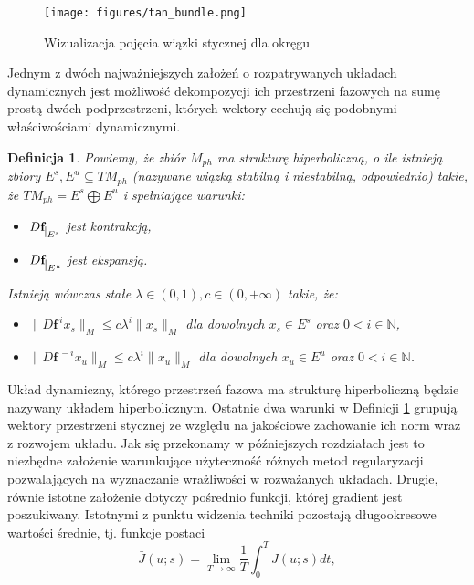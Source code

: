 \documentclass[12pt]{article}
\newtheorem{defi}{Definicja}
\begin{document}
\begin{figure}[H]
	\texttt{[image: figures/tan\_bundle.png]} 
	\centering
	\caption{Wizualizacja pojęcia wiązki stycznej dla okręgu}
	\label{Fig1}
\end{figure}
Jednym z dwóch najważniejszych założeń o rozpatrywanych układach dynamicznych jest możliwość dekompozycji ich przestrzeni fazowych na sumę prostą dwóch podprzestrzeni, których wektory cechują się podobnymi właściwościami dynamicznymi.
\begin{defi}\label{hyperbolic_set}
	Powiemy, że zbiór $M_{ph}$ ma strukturę hiperboliczną, o ile istnieją zbiory $ E^{s},E^{u} \subseteq TM_{ph}$ (nazywane wiązką stabilną i niestabilną, odpowiednio) takie, że $ TM_{ph} = E^{s} \bigoplus E^{u}$ i spełniające warunki:
	\begin{itemize}
		\item $ D\textbf{f}_{\mkern 1mu \vrule height 2ex\mkern2mu E^{s}} $ jest kontrakcją,
		\item $ D\textbf{f}_{\mkern 1mu \vrule height 2ex\mkern2mu E^{u}} $ jest ekspansją.
	\end{itemize}
	Istnieją wówczas stałe $ \lambda \in (0,1), c \in (0,+\infty) $ takie, że:
	\begin{itemize}
		\item $ \| D\textbf{f}^{\ i}x_{s}\|_{M} \leq c\lambda^{i} \| x_{s}\|_{M}$ dla dowolnych $ x_{s} \in E^{s} $ oraz $ 0 < i \in \mathbb{N} $,
		\item $ \| D\textbf{f}^{\ -i}x_{u}\|_{M} \leq c\lambda^{i} \| x_{u}\|_{M}$ dla dowolnych $ x_{u} \in E^{u} $ oraz $ 0 < i \in \mathbb{N} $.
	\end{itemize}
\end{defi}
Układ dynamiczny, którego przestrzeń fazowa ma strukturę hiperboliczną będzie nazywany układem hiperbolicznym. Ostatnie dwa warunki w Definicji \ref{hyperbolic_set} grupują wektory przestrzeni stycznej ze względu na jakościowe zachowanie ich norm wraz z rozwojem układu. Jak się przekonamy w późniejszych rozdziałach jest to niezbędne założenie warunkujące użyteczność różnych metod regularyzacji pozwalających na wyznaczanie wrażliwości w rozważanych układach. \newline
Drugie, równie istotne założenie dotyczy pośrednio funkcji, której gradient jest poszukiwany. Istotnymi z punktu widzenia techniki pozostają długookresowe wartości średnie, tj. funkcje postaci
\begin{equation}
\bar{J}(u;s) = \lim\limits_{T \rightarrow \infty}\frac{1}{T}\int_{0}^{T}J(u;s)dt,
\label{J_bar}
\end{equation}
\end{document}
